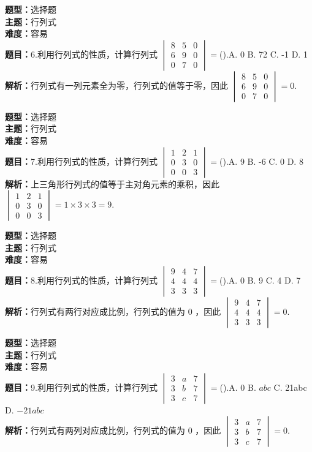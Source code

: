 \documentclass{ctexart}
\newenvironment{question}[5]{%
	\noindent\textbf{题型：}#1\\
	\textbf{主题：}#2\\
	\textbf{难度：}#3\\
	\textbf{题目：}#4\\
	\textbf{解析：}#5\\
	\vspace{1em}
}{}
\begin{document}
	\begin{question}
		{选择题}
		{行列式}
		{容易}
		{6.利用行列式的性质，计算行列式 \(\begin{vmatrix}8 & 5 & 0 \\ 6 & 9 & 0 \\ 0 & 7 & 0\end{vmatrix}=\)().A. 0 B. 72 C. -1 D. 1}
		{行列式有一列元素全为零，行列式的值等于零，因此 \(\begin{vmatrix}8 & 5 & 0 \\ 6 & 9 & 0 \\ 0 & 7 & 0\end{vmatrix}=0\).}
	\end{question}
	
	\begin{question}
		{选择题}
		{行列式}
		{容易}
		{7.利用行列式的性质，计算行列式 \(\begin{vmatrix}1 & 2 & 1 \\ 0 & 3 & 0 \\ 0 & 0 & 3\end{vmatrix}=\)().A. 9 B. -6 C. 0 D. 8}
		{上三角形行列式的值等于主对角元素的乘积，因此 \(\begin{vmatrix}1 & 2 & 1 \\ 0 & 3 & 0 \\ 0 & 0 & 3\end{vmatrix}=1 \times 3 \times 3=9\).}
	\end{question}
	
	\begin{question}
		{选择题}
		{行列式}
		{容易}
		{8.利用行列式的性质，计算行列式 \(\begin{vmatrix}9 & 4 & 7 \\ 4 & 4 & 4 \\ 3 & 3 & 3\end{vmatrix}=\)().A. 0 B. 9 C. 4 D. 7}
		{行列式有两行对应成比例，行列式的值为 0 ，因此 \(\begin{vmatrix}9 & 4 & 7 \\ 4 & 4 & 4 \\ 3 & 3 & 3\end{vmatrix}=0\).}
	\end{question}
	
	\begin{question}
		{选择题}
		{行列式}
		{容易}
		{9.利用行列式的性质，计算行列式 \(\begin{vmatrix}3 & a & 7 \\ 3 & b & 7 \\ 3 & c & 7\end{vmatrix}=\)().A. 0 B. \(abc\) C. 21abc D. \(-21abc\)}
		{行列式有两列对应成比例，行列式的值为 0 ，因此 \(\begin{vmatrix}3 & a & 7 \\ 3 & b & 7 \\ 3 & c & 7\end{vmatrix}=0\).}
	\end{question}
	
\end{document}
